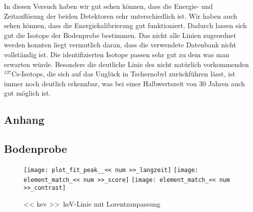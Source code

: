 \documentclass[11pt, ngerman, fleqn, DIV=15, headinclude, BCOR=2cm]{scrreprt}
\begin{document}
In diesen Versuch haben wir gut sehen können, dass die Energie- und Zeitauflösung der
beiden Detektoren sehr unterschiedlich ist. Wir haben auch sehen können, dass
die Energiekalibrierung gut funktioniert. 
Dadurch lassen sich gut die Isotope der Bodenprobe bestimmen. Das nicht
alle Linien zugeordnet werden konnten liegt vermutlich daran, dass die
verwendete Datenbank nicht vollständig ist. Die identifizierten Isotope passen
sehr gut zu dem was man erwarten würde. Besonders die deutliche Linie des
nicht natürlich vorkommenden $^{137}\text{Cs}$-Isotops, die sich auf das Unglück
in Tschernobyl zurückführen lässt, ist immer noch deutlich erkennbar, was bei
einer Halbwertszeit von 30 Jahren auch gut möglich ist.


\begin{appendix}

\chapter{Anhang}
\section{Bodenprobe}

\begin{figure}
    \centering
    \texttt{[image: plot\_fit\_peak\_\_<< num >>\_langzeit]}
    \texttt{[image: element\_match\_<< num >>\_score]}
    \texttt{[image: element\_match\_<< num >>\_contrast]}
    \caption{%
        \SI{<< kev >>}{\kilo\electronvolt}-Linie
        mit Lorentzanpassung
    }
    \label{fig:}
\end{figure}

\end{appendix}
\end{document}
